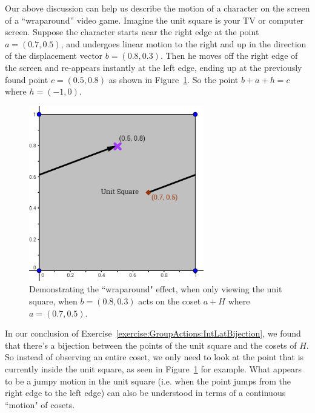 Our above discussion can help us describe the motion of a character on the screen of a ``wraparound'' video game.  Imagine the unit square is your TV or computer screen. Suppose the character starts near the right edge at the point $a=(0.7,0.5)$, and undergoes linear motion to the right and up in the direction of the displacement vector $b=(0.8,0.3)$. Then he moves off the right edge of the screen and re-appears instantly at the left edge, ending up at the previously found point $c=(0.5,0.8)$ as shown in Figure~\ref{fig:wraparound1}. So the point $b+a+h=c$ where $h=(-1,0)$.

\begin{figure}[htpb]
\begin{center}
\includegraphics[width=3in]{images/Lattice_wraparound1.png}
\caption{\label{fig:wraparound1}Demonstrating the ``wraparound" effect, when only viewing the unit square, when $b=(0.8,0.3)$ acts on the coset $a+H$ where $a=(0.7,0.5)$.}
\end{center}
\end{figure}

In our conclusion of Exercise~\ref{exercise:GroupActions:IntLatBijection}, we found that there's a bijection between the points of the unit square and the cosets of $H$. So instead of observing an entire coset, we only need to look at the point that is currently inside the unit square, as seen in Figure~\ref{fig:wraparound1} for example. What appears to be a jumpy motion in the unit square (i.e. when the point jumps from the right edge to the left edge) can also be understood in terms of a continuous ``motion" of cosets.

